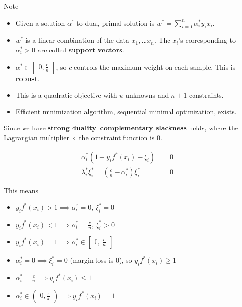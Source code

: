 \documentclass{article}
\begin{document}
Note
\begin{itemize}
  \item Given a solution $\alpha^*$ to dual, primal solution is $w^* = \sum_{i = 1}^{n}{\alpha_i^* y_i x_i}$.
  \item $w^*$ is a linear combination of the data $x_1, \dots x_n$. The $x_i$'s corresponding to $\alpha_i^* > 0$ are called \textbf{support vectors}.
  \item $\alpha^* \in \begin{bmatrix}0, \frac{c}{n}\end{bmatrix}$, so $c$ controls the maximum weight on each sample. This is \textbf{robust}.
  \item This is a quadratic objective with $n$ unknowns and $n + 1$ constraints.
  \item Efficient minimization algorithm, sequential minimal optimization, exists.
\end{itemize}

Since we have \textbf{strong duality}, \textbf{complementary slackness} holds, where the Lagrangian multiplier $\times$ the constraint function is 0.

\begin{align*}
\alpha_i^* (1 - y_i f^*(x_i) - \xi_i)                    &= 0 \\
\lambda_i^* \xi^*_i = (\frac{c}{n} - \alpha_i^*) \xi_i^* &= 0
\end{align*}

This means

\begin{itemize}
  \item $y_i f^*(x_i) > 1 \implies \alpha_i^* = 0, ~\xi_i^* = 0$
  \item $y_i f^*(x_i) < 1 \implies \alpha_i^* = \frac{c}{n}, ~\xi_i^* > 0$
  \item $y_i f^*(x_i) = 1 \implies \alpha_i^* \in \begin{bmatrix}0, ~\frac{c}{n}\end{bmatrix}$
  \item $\alpha_i^* = 0   \implies \xi_i^* = 0$ (margin loss is 0), so $y_i f^*(x_i) \geq 1$
  \item $\alpha_i^* = \frac{c}{n} \implies y_i f^*(x_i) \leq 1$
  \item $\alpha_i^* \in \begin{pmatrix}0, \frac{c}{n}\end{pmatrix} \implies y_i f^*(x_i) = 1$
\end{itemize}
\end{document}
